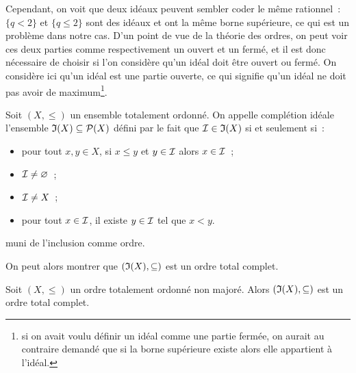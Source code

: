 Cependant, on voit que deux idéaux peuvent sembler coder le même rationnel~:
$\{q < 2\}$ et $\{q \leq 2\}$ sont des idéaux et ont la même borne supérieure,
ce qui est un problème dans notre cas. D'un point de vue de la théorie des
ordres, on peut voir ces deux parties comme respectivement un ouvert et un
fermé, et il est donc nécessaire de choisir si l'on considère qu'un idéal
doit être ouvert ou fermé. On considère ici qu'un idéal est une partie ouverte,
ce qui signifie qu'un idéal ne doit pas avoir de maximum\footnote{si on avait
voulu définir un idéal comme une partie fermée, on aurait au contraire demandé
que si la borne supérieure existe alors elle appartient à l'idéal.}.

\begin{definition}
  Soit $(X,\leq)$ un ensemble totalement ordonné. On appelle complétion idéale
  l'ensemble $\mathfrak{I}(X)\subseteq \mathcal{P}(X)$ défini par le fait que
  $\mathcal{I}\in \mathfrak{I}(X)$ si et seulement si~:
  \begin{itemize}
  \item pour tout $x,y\in X$, si $x\leq y$ et $y \in \mathcal{I}$ alors
    $x\in\mathcal{I}$~;
  \item $\mathcal{I}\neq \varnothing$~;
  \item $\mathcal{I}\neq X$~;
  \item pour tout $x \in \mathcal{I}$, il existe $y \in \mathcal{I}$ tel que $x < y$.
  \end{itemize}
  muni de l'inclusion comme ordre.
\end{definition}

\noindent
On peut alors montrer que $(\mathfrak{I}(X),\subseteq)$ est un ordre total complet.

\begin{proposition}
  Soit $(X,\leq)$ un ordre totalement ordonné non majoré. Alors
  $(\mathfrak{I}(X),\subseteq)$ est un ordre total complet.
\end{proposition}

